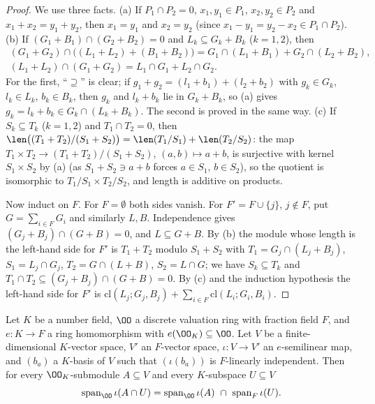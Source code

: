 \begin{proof}
We use three facts. (a) If $P_1\cap P_2=0$, $x_1,y_1\in P_1$, $x_2,y_2\in P_2$ and $x_1+x_2=y_1+y_2$, then $x_1=y_1$ and
$x_2=y_2$ (since $x_1-y_1=y_2-x_2\in P_1\cap P_2$).
(b) If $(G_1+B_1)\cap(G_2+B_2)=0$ and $L_k\subseteq G_k+B_k$ ($k=1,2$), then
\begin{gather*}
  (G_1+G_2)\cap\bigl((L_1+L_2)+(B_1+B_2)\bigr)=G_1\cap(L_1+B_1)+G_2\cap(L_2+B_2),\\
  (L_1+L_2)\cap(G_1+G_2)=L_1\cap G_1+L_2\cap G_2 .
\end{gather*}
For the first, ``$\supseteq$'' is clear; if $g_1+g_2=(l_1+b_1)+(l_2+b_2)$ with $g_k\in G_k$, $l_k\in L_k$, $b_k\in B_k$,
then $g_k$ and $l_k+b_k$ lie in $G_k+B_k$, so (a) gives $g_k=l_k+b_k\in G_k\cap(L_k+B_k)$. The second is proved
in the same way.
(c) If $S_k\subseteq T_k$ ($k=1,2$) and $T_1\cap T_2=0$, then
$\len\bigl((T_1+T_2)/(S_1+S_2)\bigr)=\len(T_1/S_1)+\len(T_2/S_2)$: the map
$T_1\times T_2\to(T_1+T_2)/(S_1+S_2)$, $(a,b)\mapsto a+b$, is surjective with kernel $S_1\times S_2$ by (a) (as
$S_1+S_2\ni a+b$ forces $a\in S_1$, $b\in S_2$), so the quotient is isomorphic to $T_1/S_1\times T_2/S_2$, and length is
additive on products.

Now induct on $F$. For $F=\emptyset$ both sides vanish. For $F'=F\cup\{j\}$, $j\notin F$, put $G=\sum_{i\in F}G_i$ and
similarly $L,B$. Independence gives $(G_j+B_j)\cap(G+B)=0$, and $L\subseteq G+B$. By (b) the module whose length is
the left-hand side for $F'$ is $T_1+T_2$ modulo $S_1+S_2$ with $T_1=G_j\cap(L_j+B_j)$, $S_1=L_j\cap G_j$,
$T_2=G\cap(L+B)$, $S_2=L\cap G$; we have $S_k\subseteq T_k$ and $T_1\cap T_2\subseteq(G_j+B_j)\cap(G+B)=0$. By (c) and the
induction hypothesis the left-hand side for $F'$ is $\mathrm{cl}(L_j;G_j,B_j)+\sum_{i\in F}\mathrm{cl}(L_i;G_i,B_i)$.
\end{proof}

\begin{proposition}\label{pf:baselat2:latbc}
Let $K$ be a number field, $\OO$ a discrete valuation ring with fraction field $F$, and $e:K\to F$ a ring
homomorphism with $e(\OO_K)\subseteq\OO$. Let $V$ be a finite-dimensional $K$-vector space, $V'$ an $F$-vector
space, $\iota:V\to V'$ an $e$-semilinear map, and $(b_a)$ a $K$-basis of $V$ such that $(\iota(b_a))$ is
$F$-linearly independent. Then for every $\OO_K$-submodule $A\subseteq V$ and every $K$-subspace $U\subseteq V$
\[
  \mathrm{span}_{\OO}\,\iota(A\cap U)=\mathrm{span}_{\OO}\,\iota(A)\ \cap\ \mathrm{span}_F\,\iota(U).
\]
\end{proposition}

